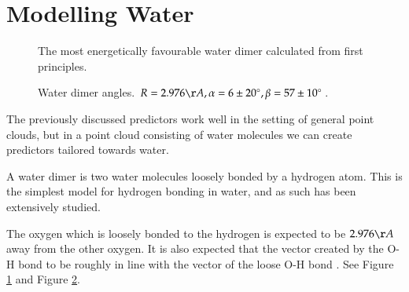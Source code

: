 \documentclass[a4paper]{report}
\newcommand{\degree}{\ensuremath{^\circ}}
\begin{document}
\section{Modelling Water}
\label{sec:modelling-water}

\begin{figure}[h]
\centering
{}
\caption{The most energetically favourable water dimer calculated from first
  principles. \citep{watermolecule}}
\label{fig:dimer}
\end{figure}

\begin{figure}[h]
\centering
{}
\caption{Water dimer angles. $R = 2.976\AA, \alpha = 6 \pm 20\degree, \beta =
  57 \pm 10\degree$. \citep{watermolecule}}
\label{fig:dimer-angle}
\end{figure}

The previously discussed predictors work well in the setting of general point
clouds, but in a point cloud consisting of water molecules we can create
predictors tailored towards water.

A water dimer is two water molecules loosely bonded by a hydrogen atom. This
is the simplest model for hydrogen bonding in water, and as such has been
extensively studied.

The oxygen which is loosely bonded to the hydrogen is expected to be
$2.976\AA$ away from the other oxygen. It is also expected that the vector
created by the O-H bond to be roughly in line with the vector of the loose O-H
bond \citep{watermolecule}. See Figure \ref{fig:dimer} and Figure
\ref{fig:dimer-angle}.
\end{document}
